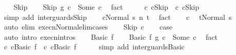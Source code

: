 \begin{isabellebody}
\ \ \isamarkupfalse%
\ Skip\isanewline
\ \ \isamarkupfalse%
\ {\isachardoublequoteopen}{\isacharparenleft}Skip\ {\isasyminter}\isactrlsub g\ c{}{\isacharparenright}\ {\isacharequal}\ Some\ c{\isachardoublequoteclose}\ \isamarkupfalse%
\ fact\isanewline
\ \ \isamarkupfalse%
\ \isamarkupfalse%
\ c{}{\isacharcolon}\ {\isachardoublequoteopen}c{}{\isacharequal}Skip{\isachardoublequoteclose}\ \ c{\isacharcolon}\ {\isachardoublequoteopen}c{\isacharequal}Skip{\isachardoublequoteclose}\isanewline
\ \ \ \ \isamarkupfalse%
\ {\isacharparenleft}simp\ add{\isacharcolon}\ inter{\isacharunderscore}guards{\isacharunderscore}Skip{\isacharparenright}\isanewline
\ \ \isamarkupfalse%
\ {\isachardoublequoteopen}{\isasymGamma}{\isasymturnstile}{\isasymlangle}c{\isacharcomma}Normal\ s{\isasymrangle}\ {\isacharequal}n{\isasymRightarrow}\ t{\isachardoublequoteclose}\ \isamarkupfalse%
\ fact\isanewline
\ \ \isamarkupfalse%
\ c\ \isamarkupfalse%
\ {\isachardoublequoteopen}t{\isacharequal}Normal\ s{\isachardoublequoteclose}\isanewline
\ \ \ \ \isamarkupfalse%
\ {\isacharparenleft}auto\ elim{\isacharcolon}\ execn{\isacharunderscore}Normal{\isacharunderscore}elim{\isacharunderscore}cases{\isacharparenright}\isanewline
\ \ \isamarkupfalse%
\ Skip\ c{}\isanewline
\ \ \isamarkupfalse%
\ {\isacharquery}case\isanewline
\ \ \ \ \isamarkupfalse%
\ {\isacharparenleft}auto\ intro{\isacharcolon}\ execn{\isachardot}intros{\isacharparenright}\isanewline
{}\isamarkupfalse%
\isanewline
\ \ \isamarkupfalse%
\ {\isacharparenleft}Basic\ f{\isacharparenright}\isanewline
\ \ \isamarkupfalse%
\ {\isachardoublequoteopen}{\isacharparenleft}Basic\ f\ {\isasyminter}\isactrlsub g\ c{}{\isacharparenright}\ {\isacharequal}\ Some\ c{\isachardoublequoteclose}\ \isamarkupfalse%
\ fact\isanewline
\ \ \isamarkupfalse%
\ \isamarkupfalse%
\ c{}{\isacharcolon}\ {\isachardoublequoteopen}c{}{\isacharequal}Basic\ f{\isachardoublequoteclose}\ \ c{\isacharcolon}\ {\isachardoublequoteopen}c{\isacharequal}Basic\ f{\isachardoublequoteclose}\isanewline
\ \ \ \ \isamarkupfalse%
\ {\isacharparenleft}simp\ add{\isacharcolon}\ inter{\isacharunderscore}guards{\isacharunderscore}Basic{\isacharparenright}\isanewline

\end{isabellebody}
